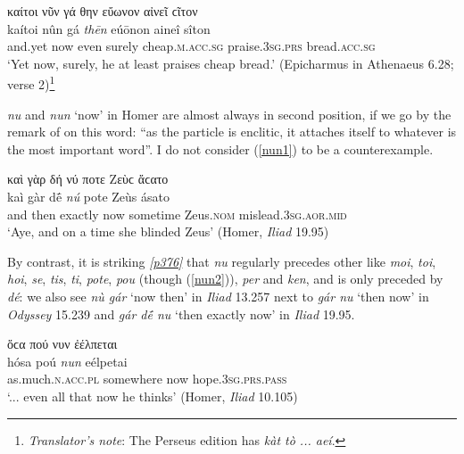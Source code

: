 \begin{exe}
\ex καίτοι νῦν γά θην εὔωνον αἰνεῖ ϲῖτον\\
\gll kaítoi nûn gá \emph{thēn} eúōnon aineî sîton\\
and.yet now even surely cheap.\textsc{m.acc.sg} praise.\textsc{3sg.prs} bread.\textsc{acc.sg}\\
\trans `Yet now, surely, he at least praises cheap bread.' (Epicharmus in Athenaeus 6.28; \citealp[226]{Lorenz1864} verse 2)\footnote{\emph{Translator's note}: The Perseus edition has \textit{kàt tò ... aeí}.}
\label{then7}
\end{exe}

\textit{nu} and \textit{nun} `now' in Homer are almost always in second position, if we go by the remark of \citet{Ebeling} on this word: ``as the particle is enclitic, it attaches itself to whatever is the most important word''. I do not consider (\ref{nun1}) to be a counterexample.

\begin{exe}
\ex καὶ γὰρ δή νύ ποτε Ζεὺϲ ἄϲατο\\
\gll kaì gàr dḗ \emph{nú} pote Zeùs ásato\\
and then exactly now sometime Zeus.\textsc{nom} mislead.\textsc{3sg.aor.mid}\\
\trans `Aye, and on a time she blinded Zeus' (Homer, \textit{Iliad} 19.95)
\label{nun1}
\end{exe}

By contrast, it is striking \hyperlink{p376}{\emph{[p376]}} that \textit{nu} regularly precedes other  like \textit{moi}, \textit{toi}, \textit{hoi}, \textit{se}, \textit{tis}, \textit{ti}, \textit{pote}, \textit{pou} (though (\ref{nun2})), \textit{per} and \textit{ken}, and is only preceded by \textit{dé}: we also see \textit{nù gár} `now then' in \textit{Iliad} 13.257 next to \textit{gár nu} `then now' in \textit{Odyssey} 15.239 and \textit{gár dḗ nu} `then exactly now' in \textit{Iliad} 19.95.

\begin{exe}
\ex ὅϲα πού νυν ἐέλπεται\\
\gll hósa poú \emph{nun} eélpetai\\
as.much.\textsc{n.acc.pl} somewhere now hope.\textsc{3sg.prs.pass}\\
\trans `... even all that now he thinks' (Homer, \textit{Iliad} 10.105)
\label{nun2}
\end{exe}

